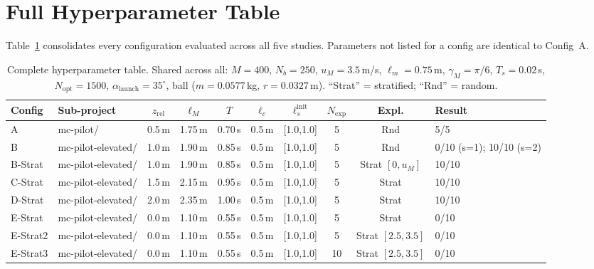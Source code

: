 
\section{Full Hyperparameter Table}
\label{app:hyperparams}

Table~\ref{tab:full_hyperparams} consolidates every configuration evaluated across all
five studies.
Parameters not listed for a config are identical to Config~A.

\begin{table}[ht]
  \centering
  \caption{Complete hyperparameter table. Shared across all: $M{=}400$, $N_b{=}250$,
           $u_M{=}3.5$\,m/s, $\ell_m{=}0.75$\,m, $\gamma_M{=}\pi/6$, $T_s{=}0.02$\,s,
           $N_{\mathrm{opt}}{=}1500$, $\alpha_{\mathrm{launch}}{=}35^\circ$,
           ball ($m{=}0.0577$\,kg, $r{=}0.0327$\,m).
           ``Strat'' = stratified; ``Rnd'' = random.}
  \label{tab:full_hyperparams}
  \small
  \begin{tabular}{llcccccccl}
    \toprule
    Config & Sub-project & $z_{\mathrm{rel}}$ & $\ell_M$ & $T$ & $\ell_c$ &
    $\ell_s^{\mathrm{init}}$ & $N_{\mathrm{exp}}$ & Expl. & Result \\
    \midrule
    A               & mc-pilot/           & 0.5\,m & 1.75\,m & 0.70\,s & 0.5\,m & [1.0,1.0] & 5  & Rnd & 5/5 \\
    B               & mc-pilot-elevated/  & 1.0\,m & 1.90\,m & 0.85\,s & 0.5\,m & [1.0,1.0] & 5  & Rnd & 0/10 (s=1); 10/10 (s=2) \\
    B-Strat         & mc-pilot-elevated/  & 1.0\,m & 1.90\,m & 0.85\,s & 0.5\,m & [1.0,1.0] & 5  & Strat $[0,u_M]$ & 10/10 \\
    C-Strat         & mc-pilot-elevated/  & 1.5\,m & 2.15\,m & 0.95\,s & 0.5\,m & [1.0,1.0] & 5  & Strat & 10/10 \\
    D-Strat         & mc-pilot-elevated/  & 2.0\,m & 2.35\,m & 1.00\,s & 0.5\,m & [1.0,1.0] & 5  & Strat & 10/10 \\
    E-Strat         & mc-pilot-elevated/  & 0.0\,m & 1.10\,m & 0.55\,s & 0.5\,m & [1.0,1.0] & 5  & Strat & 0/10 \\
    E-Strat2        & mc-pilot-elevated/  & 0.0\,m & 1.10\,m & 0.55\,s & 0.5\,m & [1.0,1.0] & 5  & Strat $[2.5,3.5]$ & 0/10 \\
    E-Strat3        & mc-pilot-elevated/  & 0.0\,m & 1.10\,m & 0.55\,s & 0.5\,m & [1.0,1.0] & 10 & Strat $[2.5,3.5]$ & 0/10 \\

\end{tabular}
\end{table}
